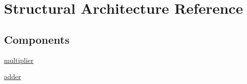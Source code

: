 \hypertarget{class_linear_regression_1_1_structural}{}\section{Structural Architecture Reference}
\label{class_linear_regression_1_1_structural}
\subsection*{Components}
 \begin{DoxyCompactItemize}
\item 
\hyperlink{group___linear_regression_ga3cf9cbfc3e637ae0660c32ceef50386f}{multiplier}  {\bfseries }  
\item 
\hyperlink{group___linear_regression_ga9d7a8a381439c61aea549e7a47ec7a6f}{adder}  {\bfseries }  
\end{DoxyCompactItemize}
